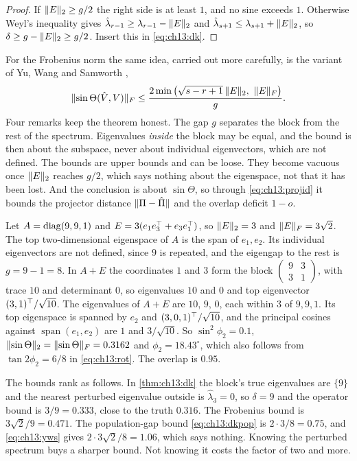 \begin{proof}
If $\lVert E\rVert_2\ge g/2$ the right side is at least $1$, and no sine exceeds $1$.
Otherwise Weyl's inequality gives $\hat\lambda_{r-1}\ge\lambda_{r-1}-\lVert E\rVert_2$
and $\hat\lambda_{s+1}\le\lambda_{s+1}+\lVert E\rVert_2$, so
$\delta\ge g-\lVert E\rVert_2\ge g/2$. Insert this in \cref{eq:ch13:dk}.
\end{proof}

For the Frobenius norm the same idea, carried out more carefully, is the
variant of Yu, Wang and Samworth \cite{yuwangsamworth2015},
\begin{equation}\label{eq:ch13:yws}
\norm{\sin\Theta(\hat V,V)}_F\le\frac{2\min\big(\sqrt{s-r+1}\,\norm{E}_2,\ \norm{E}_F\big)}{g}.
\end{equation}
Four remarks keep the theorem honest. The gap $g$ separates the block from the
rest of the spectrum. Eigenvalues \emph{inside} the block may be equal, and the
bound is then about the subspace, never about individual eigenvectors, which are
not defined. The bounds are upper bounds and can be loose. They become vacuous
once $\lVert E\rVert_2$ reaches $g/2$, which says nothing about the eigenspace, not that
it has been lost. And the conclusion is about $\sin\Theta$, so through
\cref{eq:ch13:projid} it bounds the projector distance $\lVert \Pi-\hat\Pi\rVert$ and the
overlap deficit $1-o$.

\begin{example}\label{ex:ch13:dk}
Let $A=\operatorname{diag}(9,9,1)$ and $E=3(e_1e_3^{\top}+e_3e_1^{\top})$, so $\lVert E\rVert_2=3$ and
$\lVert E\rVert_F=3\sqrt2$. The top two-dimensional eigenspace of $A$ is the span of
$e_1,e_2$. Its individual eigenvectors are not defined, since $9$ is repeated,
and the eigengap to the rest is $g=9-1=8$. In $A+E$ the coordinates $1$ and $3$
form the block $\begin{pmatrix}9&3\\3&1\end{pmatrix}$, with trace $10$ and
determinant $0$, so eigenvalues $10$ and $0$ and top eigenvector
$(3,1)^{\top}/\sqrt{10}$. The eigenvalues of $A+E$ are $10$, $9$, $0$, each within
$3$ of $9,9,1$. Its top eigenspace is spanned by $e_2$ and $(3,0,1)^{\top}/\sqrt{10}$,
and the principal cosines against $\operatorname{span}(e_1,e_2)$ are $1$ and
$3/\sqrt{10}$. So $\sin^2\phi_2=0.1$, $\lVert \sin\Theta\rVert_2=\lVert \sin\Theta\rVert_F=0.3162$
and $\phi_2=18.43^\circ$, which also follows from $\tan2\phi_2=6/8$ in
\cref{eq:ch13:rot}. The overlap is $0.95$.

The bounds rank as follows. In \cref{thm:ch13:dk} the block's true eigenvalues
are $\{9\}$ and the nearest perturbed eigenvalue outside is $\hat\lambda_3=0$, so
$\delta=9$ and the operator bound is $3/9=0.333$, close to the truth $0.316$. The
Frobenius bound is $3\sqrt2/9=0.471$. The population-gap bound
\cref{eq:ch13:dkpop} is $2\cdot3/8=0.75$, and \cref{eq:ch13:yws} gives
$2\cdot3\sqrt2/8=1.06$, which says nothing. Knowing the perturbed spectrum buys
a sharper bound. Not knowing it costs the factor of two and more.
\end{example}

